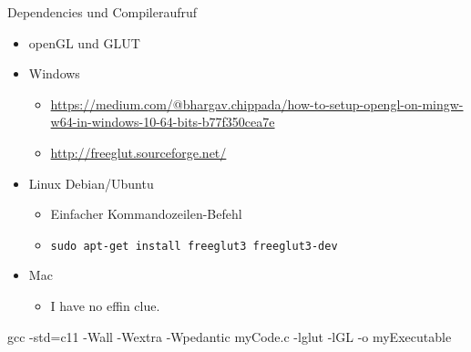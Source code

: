 \begin{frame}{Dependencies und Compileraufruf}
%
\begin{itemize}
\item openGL und GLUT
\item Windows
	\begin{itemize}
	\item \url{https://medium.com/@bhargav.chippada/how-to-setup-opengl-on-mingw-w64-in-windows-10-64-bits-b77f350cea7e}
	\item \url{http://freeglut.sourceforge.net/}
	\end{itemize}
\item Linux Debian/Ubuntu
	\begin{itemize}
	\item Einfacher Kommandozeilen-Befehl
	\item \texttt{sudo apt-get install freeglut3 freeglut3-dev}
	\end{itemize}
\item Mac
	\begin{itemize}
	\item I have no effin clue.
	\end{itemize}
\end{itemize}
%
\begin{cmdbox}
\scriptsize
gcc -std=c11 -Wall -Wextra -Wpedantic myCode.c {\color{cyan} -lglut -lGL} -o myExecutable
\end{cmdbox}
%
\end{frame}


